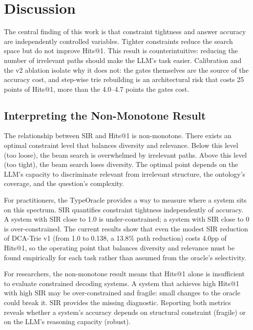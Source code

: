 
\section{Discussion}
\label{sec:discussion}

The central finding of this work is that constraint tightness and answer accuracy are
independently controlled variables. Tighter constraints reduce the search space but do
not improve Hits@1. This result is counterintuitive: reducing the number of irrelevant
paths should make the LLM's task easier. Calibration and the v2 ablation isolate why it
does not: the gates themselves are the source of the accuracy cost, and step-wise trie
rebuilding is an architectural risk that costs 25 points of Hits@1, more than the 4.0--4.7 points the gates cost.

\subsection{Interpreting the Non-Monotone Result}
\label{sec:discussion:interpretation}

The relationship between SIR and Hits@1 is non-monotone. There exists an optimal
constraint level that balances diversity and relevance. Below this level (too loose), the
beam search is overwhelmed by irrelevant paths. Above this level (too tight), the beam
search loses diversity. The optimal point depends on the LLM's capacity to discriminate
relevant from irrelevant structure, the ontology's coverage, and the question's
complexity.

For practitioners, the TypeOracle provides a way to measure where a system sits on this
spectrum. SIR quantifies constraint tightness independently of accuracy. A system with
SIR close to 1.0 is under-constrained; a system with SIR close to 0 is over-constrained.
The current results show that even the modest SIR reduction of DCA-Trie v1 (from 1.0 to
0.138, a 13.8\% path reduction) costs 4.0pp of Hits@1, so the operating point that
balances diversity and relevance must be found empirically for each task rather than
assumed from the oracle's selectivity.

For researchers, the non-monotone result means that Hits@1 alone is insufficient to
evaluate constrained decoding systems. A system that achieves high Hits@1 with high SIR
may be over-constrained and fragile: small changes to the oracle could break it. SIR
provides the missing diagnostic. Reporting both metrics reveals whether a system's
accuracy depends on structural constraint (fragile) or on the LLM's reasoning capacity
(robust).

